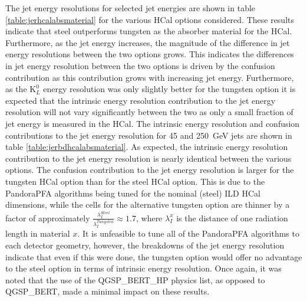 The jet energy resolutions for selected jet energies are shown in table \ref{table:jerhcalabsmaterial} for the various HCal options considered.  These results indicate that steel outperforms tungsten as the absorber material for the HCal.  Furthermore, as the jet energy increases, the magnitude of the difference in jet energy resolutions between the two options grows.  This indicates the differences in jet energy resolution between the two options is driven by the confusion contribution as this contribution grows with increasing jet energy.  Furthermore, as the $\text{K}^{0}_{L}$ energy resolution was only slightly better for the tungsten option it is expected that the intrinsic energy resolution contribution to the jet energy resolution will not vary significantly between the two as only a small fraction of jet energy is measured in the HCal.  The intrinsic energy resolution and confusion contributions to the jet energy resolution for 45 and 250~GeV jets are shown in table \ref{table:jerbdhcalabsmaterial}.  As expected, the intrinsic energy resolution contribution to the jet energy resolution is nearly identical between the various options.  The confusion contribution to the jet energy resolution is larger for the tungsten HCal option than for the steel HCal option.  This is due to the PandoraPFA algorithms being tuned for the nominal (steel) ILD HCal dimensions, while the cells for the alternative tungsten option are thinner by a factor of approximately $\frac{\lambda_{I}^{Steel}}{\lambda_{I}^{Tungsten}} \approx 1.7$, where $\lambda_{I}^{x}$ is the distance of one radiation length in material $x$.  It is unfeasible to tune all of the PandoraPFA algorithms to each detector geometry, however, the breakdowns of the jet energy resolution indicate that even if this were done, the tungsten option would offer no advantage to the steel option in terms of intrinsic energy resolution.  Once again, it was noted that the use of the QGSP\_BERT\_HP physics list, as opposed to QGSP\_BERT, made a minimal impact on these results.

